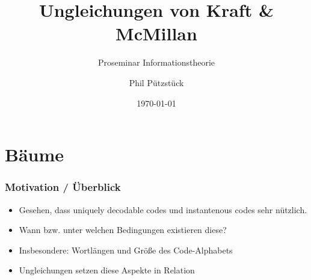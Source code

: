 \documentclass{beamer}
\title{Ungleichungen von Kraft \& McMillan}
\subtitle{Proseminar Informationstheorie}
\author{Phil Pützstück}
\date{\today}
\newcommand{\UC}[0]{uniquely decodable codes }
\newcommand{\IC}[0]{instantenous codes }
\begin{document}
\maketitle

\section{Bäume}
\begin{frame}
    \frametitle{Motivation / Überblick}
    \begin{itemize}
        \setlength\itemsep{1em}
        \item Gesehen, dass \UC und \IC sehr nützlich.
        \item Wann bzw. unter welchen Bedingungen existieren diese?
        \item Insbesondere: Wortlängen und Größe des Code-Alphabets
        \item Ungleichungen setzen diese Aspekte in Relation
    \end{itemize}
\end{frame}
\end{document}
